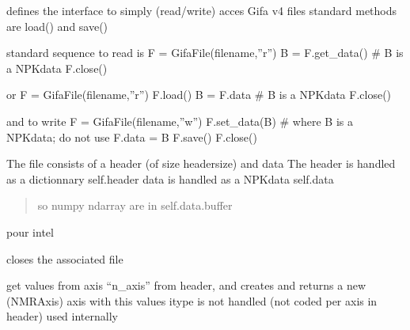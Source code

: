 \documentclass[letterpaper,10pt,openany,oneside]{sphinxmanual}
\begin{document}
\begin{fulllineitems}
\label{rst/code:File.GifaFile.GifaFile}
defines the interface to simply (read/write) acces Gifa v4 files
standard methods are load() and save()

standard sequence to read is
F = GifaFile(filename,''r'')
B = F.get\_data()      \# B is a NPKdata
F.close()

or
F = GifaFile(filename,''r'')
F.load()
B = F.data      \# B is a NPKdata
F.close()

and to write
F = GifaFile(filename,''w'')
F.set\_data(B)         \# where B is a NPKdata; do not use    F.data = B
F.save()
F.close()

The file consists of a header (of size headersize) and data
The header is handled as a dictionnary  self.header
data is handled as a NPKdata    self.data
\begin{quote}

so numpy ndarray are in                self.data.buffer
\end{quote}

\begin{fulllineitems}
\label{rst/code:File.GifaFile.GifaFile.byte_order}
pour intel

\end{fulllineitems}


\begin{fulllineitems}
\label{rst/code:File.GifaFile.GifaFile.close}
closes the associated file

\end{fulllineitems}


\begin{fulllineitems}
\label{rst/code:File.GifaFile.GifaFile.copyaxesfromheader}
get values from axis ``n\_axis'' from header, and creates and returns a new (NMRAxis) axis with this values
itype is not handled (not coded per axis in header)
used internally

\end{fulllineitems}


\end{fulllineitems}
\end{document}
